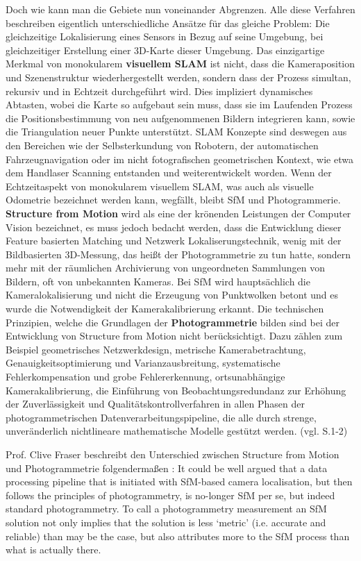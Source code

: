 Doch wie kann man die Gebiete nun voneinander Abgrenzen. Alle diese Verfahren beschreiben eigentlich unterschiedliche Ansätze für das gleiche Problem: Die gleichzeitige Lokalisierung eines Sensors in Bezug auf seine Umgebung, bei gleichzeitiger Erstellung einer 3D-Karte dieser Umgebung. Das einzigartige Merkmal von monokularem \textbf{visuellem SLAM} ist nicht, dass die Kameraposition und Szenenstruktur wiederhergestellt werden, sondern dass der Prozess simultan, rekursiv und in Echtzeit durchgeführt wird. Dies impliziert dynamisches Abtasten, wobei die Karte so aufgebaut sein muss, dass sie im Laufenden Prozess die Positionsbestimmung von neu aufgenommenen Bildern integrieren kann, sowie die Triangulation neuer Punkte unterstützt. SLAM Konzepte sind deswegen aus den Bereichen wie der Selbsterkundung von Robotern, der automatischen Fahrzeugnavigation oder im nicht fotografischen geometrischen Kontext, wie etwa dem Handlaser Scanning entstanden und weiterentwickelt worden. Wenn der Echtzeitaspekt von monokularem visuellem SLAM, was auch als visuelle Odometrie bezeichnet werden kann, wegfällt, bleibt SfM und Photogrammerie. \textbf{Structure from Motion} wird als eine der krönenden Leistungen der Computer Vision bezeichnet, es muss jedoch bedacht werden, dass die Entwicklung dieser Feature basierten Matching und Netzwerk Lokaliserungstechnik, wenig mit der Bildbasierten 3D-Messung, das heißt der Photogrammetrie zu tun hatte, sondern mehr mit der räumlichen Archivierung von ungeordneten Sammlungen von Bildern, oft von unbekannten Kameras. Bei SfM wird hauptsächlich die Kameralokalisierung und nicht die Erzeugung von Punktwolken betont und es wurde die Notwendigkeit der Kamerakalibrierung erkannt. Die technischen Prinzipien, welche die Grundlagen der \textbf{Photogrammetrie} bilden sind bei der Entwicklung von Structure from Motion nicht berücksichtigt. Dazu zählen zum Beispiel geometrisches Netzwerkdesign, metrische Kamerabetrachtung, Genauigkeitsoptimierung und Varianzausbreitung, systematische Fehlerkompensation und grobe Fehlererkennung, ortsunabhängige Kamerakalibrierung, die Einführung von Beobachtungsredundanz zur Erhöhung der Zuverlässigkeit und Qualitätskontrollverfahren in allen Phasen der photogrammetrischen Datenverarbeitungspipeline, die alle durch strenge, unveränderlich nichtlineare mathematische Modelle gestützt werden. (vgl. \cite{vergleich_fraser} S.1-2)

Prof. Clive Fraser beschreibt den Unterschied zwischen Structure from Motion und Photogrammetrie folgendermaßen \cite{vergleich_fraser}: \glqq It could be well argued that a data processing pipeline that is initiated with SfM-based camera localisation, but then follows the principles of photogrammetry, is no-longer SfM per se, but indeed standard photogrammetry. To call a photogrammetry measurement an SfM solution not only implies that the solution is less ‘metric’ (i.e. accurate and reliable) than may be the case, but also attributes more to the SfM process than what is actually there.\grqq

